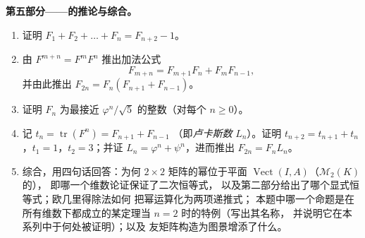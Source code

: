 \begin{problem}
\medskip
\noindent\textbf{第五部分——的推论与综合。}
\begin{enumerate}[resume]
  \item 证明 $F_1 + F_2 + \dots + F_n = F_{n+2} - 1$。
  \item 由 $F^{m+n} = F^m F^n$ 推出加法公式
        \[
        F_{m+n} = F_{m+1}F_n + F_m F_{n-1},
        \]
        并由此推出 $F_{2n} = F_n(F_{n+1} + F_{n-1})$。
  \item 证明 $F_n$ 为最接近
        $\varphi^n/\sqrt5$ 的整数（对每个 $n \geq 0$）。
  \item 记 $t_n = \operatorname{tr}(F^n) = F_{n+1} + F_{n-1}$
        （即\emph{卢卡斯数} $L_n$）。证明 $t_{n+2} =
        t_{n+1} + t_n$，$t_1 = 1$，$t_2 = 3$；并证 $L_n =
        \varphi^n + \psi^n$，进而推出 $F_{2n} = F_n L_n$。
  \item 综合，用四句话回答：为何 $2
        \times 2$ 矩阵的幂位于平面
        $\operatorname{Vect}(I, A)$（$\mathcal{M}_2(K)$ 的），
        即哪一个维数论证保证了二次恒等式，
        以及第二部分给出了哪个显式恒等式；欧几里得除法如何
        把幂运算化为两项递推式；
        本题中哪一个命题是在所有维数下都成立的某定理当 $n =
        2$ 时的特例（写出其名称，
        并说明它在本系列中于何处被证明）；以及
        友矩阵构造为图景增添了什么。
\end{enumerate}
\end{problem}
